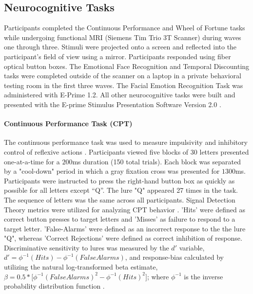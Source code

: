 \documentclass{article}%
\begin{document}
\subsection*{Neurocognitive Tasks}  Participants completed the Continuous Performance and Wheel of Fortune tasks while undergoing functional MRI (Siemens Tim Trio 3T Scanner) during waves one through three. Stimuli were projected onto a screen and reflected into the participant's field of view using a mirror. Participants responded using fiber optical button boxes. The Emotional Face Recognition and Temporal Discounting tasks were completed outside of the scanner on a laptop in a private behavioral testing room in the first three waves. The Facial Emotion Recognition Task was administered with E-Prime 1.2. All other neurocognitive tasks were built and presented with the E-prime Stimulus Presentation Software Version 2.0 \citep{schneider2002prime}. 
\paragraph*{Continuous Performance Task (CPT)} The continuous performance task was used to measure impulsivity and inhibitory control of reflexive actions \citep{horn2003response}.  Participants viewed five blocks of $30$ letters presented one-at-a-time for a $200$ms duration (150 total trials). Each block was separated by a "cool-down" period in which a gray fixation cross was presented for $1300$ms. Participants were instructed to press the right-hand button box as quickly as possible for all letters except “Q”. The lure "Q" appeared 27 times in the task. The sequence of letters was the same across all participants.  Signal Detection Theory metrics were utilized for analyzing CPT behavior \cite{stanislaw1999calculation}. 'Hits' were defined as correct button presses to target letters and 'Misses' as failure to respond to a target letter. 'False-Alarms' were defined as an incorrect response to the the lure "Q", whereas 'Correct Rejections' were defined as correct inhibition of response. Discriminative sensitivity to lures was measured by the $d'$ variable, $d'=\phi^{-1}( Hits ) - \phi^{-1}( False Alarms )$, and response-bias calculated by utilizing the natural log-transformed beta estimate, $ \beta = 0.5*\Big[\phi^{-1}(FalseAlarms)^{2} - \phi^{-1}(Hits)^{2}\Big]$; where $\phi^{-1}$ is the inverse probability distribution function  \citep{forbes2011statistical}. 
\end{document}
